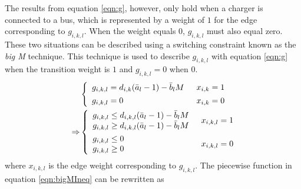 The results from equation \ref{eqn:g}, however, only hold when a charger is connected to a bus, which is represented by a weight of $1$ for the edge corresponding to $g_{i,k,l}$. When the weight equals $0$, $g_{i,k,l}$ must also equal zero. These two situations can be described using a switching constraint known as the \textit{big M} technique. This technique is used to describe $g_{i,k,l}$ with equation \ref{eqn:g} when the transition weight is $1$ and $g_{i,k,l} = 0$ when $0$.
\begin{equation}\label{eqn:bigMIneq}
\begin{aligned}
	& \begin{dcases} 
		\begin{array}{l}
		g_{i,k,l} = d_{i,k}(\bar{a}_l - 1) - \bar{b}_lM
		\end{array} & x_{i,k} = 1\\
		\begin{array}{l}
		g_{i,k,l} = 0
		\end{array} & x_{i,k} = 0\\
	\end{dcases} \\ 
	\Rightarrow & 
	\begin{dcases} 
		\begin{array}{l}
		g_{i,k,l} \le d_{i,k,l}(\bar{a}_l - 1) - \bar{b}_lM\\
		g_{i,k,l} \ge d_{i,k,l}(\bar{a}_l - 1) - \bar{b}_lM\\
		\end{array}
		& x_{i,k,l} = 1 \\
		\begin{array}{l}
		g_{i,k,l} \le 0 \\
		g_{i,k,l} \ge 0 \\
		\end{array} & x_{i,k,l} = 0\\
    	\end{dcases} 
\end{aligned}
\end{equation}
where $x_{i,k,l}$ is the edge weight corresponding to $g_{i,k,l}$.  The piecewise function in equation \ref{eqn:bigMIneq} can be rewritten as 
